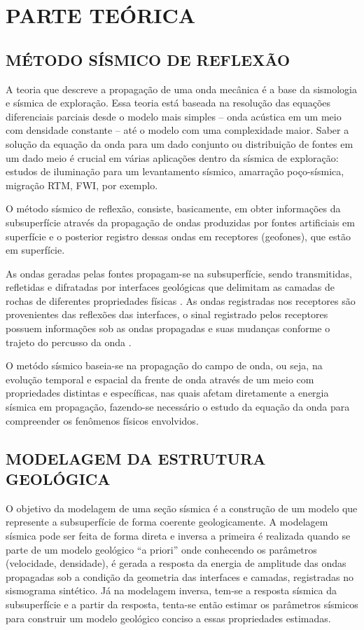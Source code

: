 \chapter{PARTE TEÓRICA}
\label{cap.2}

\section{MÉTODO SÍSMICO DE REFLEXÃO}
A teoria que descreve a propagação de uma onda mecânica é a base da sismologia e
sísmica de exploração. Essa teoria está baseada na resolução das equações diferenciais
parciais desde o modelo mais simples – onda acústica em um meio com densidade constante
– até o modelo com uma complexidade maior. Saber a solução da equação da onda para
um dado conjunto ou distribuição de fontes em um dado meio é crucial em várias aplicações
dentro da sísmica de exploração: estudos de iluminação para um levantamento sísmico,
amarração poço-sísmica, migração RTM, FWI, por exemplo.

O método sísmico de reflexão, consiste, basicamente, em obter informações da subsuperfície através da propagação de ondas produzidas por fontes artificiais em superfície e o posterior registro dessas ondas em receptores (geofones), que estão em superfície.

As ondas geradas pelas fontes propagam-se na subsuperfície, sendo transmitidas, refletidas e difratadas por interfaces geológicas que delimitam as camadas de rochas de diferentes propriedades físicas \citep{zakaria2000two}.
As ondas registradas nos receptores são provenientes das reflexões das interfaces, o sinal registrado pelos receptores possuem informações sob as ondas propagadas e suas mudanças conforme o trajeto do percusso da onda \citep{yilmaz2001seismic}.


O metódo sísmico baseia-se na propagação do campo de onda, ou seja, na evolução temporal e espacial da frente de onda através de um meio com propriedades distintas e específicas, nas quais afetam diretamente a energia sísmica em propagação, fazendo-se necessário o estudo da equação da onda para compreender os fenômenos físicos envolvidos.


\section{MODELAGEM DA ESTRUTURA GEOLÓGICA}

O objetivo da modelagem de uma seção sísmica é a construção de um modelo que represente a subsuperfície de forma coerente geologicamente. A modelagem sísmica pode ser feita de forma direta e inversa a primeira é realizada quando se parte de um modelo geológico ``a priori'' onde conhecendo os parâmetros (velocidade, densidade), é gerada a resposta da energia de amplitude das ondas propagadas sob a condição da geometria das interfaces e camadas, registradas no sismograma sintético. Já na modelagem inversa, tem-se a resposta sísmica da subsuperfície e a partir da resposta, tenta-se então estimar os parâmetros sísmicos para construir um modelo geológico conciso a essas propriedades estimadas.

